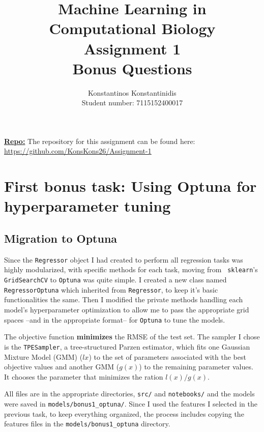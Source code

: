 \documentclass[12pt]{article}
\title{%
    Machine Learning in Computational Biology \\
    \Large Assignment 1 \\
    Bonus Questions
    }
\author{%
    Konstantinos Konstantinidis \\
    Student number: 7115152400017
    }
\begin{document}
\maketitle

\vspace{0.5in}

\textbf{\underline{Repo:}} The repository for this assignment can be found here: \\
\url{https://github.com/KonsKons26/Assignment-1}

\vspace{0.5in}

\tableofcontents


\clearpage
\section{First bonus task: Using Optuna for hyperparameter tuning}


\subsection{Migration to Optuna}
Since the \texttt{Regressor} object I had created to perform all regression tasks
was highly modularized, with specific methods for each task, moving from \texttt{%
sklearn}'s \texttt{GridSearchCV} to \texttt{Optuna} was quite simple. I created
a new class named \texttt{RegressorOptuna} which inherited from \texttt{Regressor},
to keep it's basic functionalities the same. Then I modified the private methods
handling each model's hyperparameter optimization to allow me to pass the appropriate
grid spaces --and in the appropriate format-- for \texttt{Optuna} to tune the models.

The objective function \textbf{minimizes} the RMSE of the test set. The sampler
I chose is the \texttt{TPESampler}, a tree-structured Parzen estimator, which fits
one Gaussian Mixture Model (GMM) ($l{x}$) to the set of parameters associated with
the best objective values and another GMM ($g(x)$) to the remaining parameter values.
It chooses the parameter that minimizes the ration $l(x)/g(x)$.

All files are in the appropriate directories, \texttt{src/} and \texttt{notebooks/}
and the models were saved in \texttt{models/bonus1\_optuna/}. Since I used the
features I selected in the previous task, to keep everything organized, the process
includes copying the features files in the \texttt{models/bonus1\_optuna}
directory.
\end{document}
